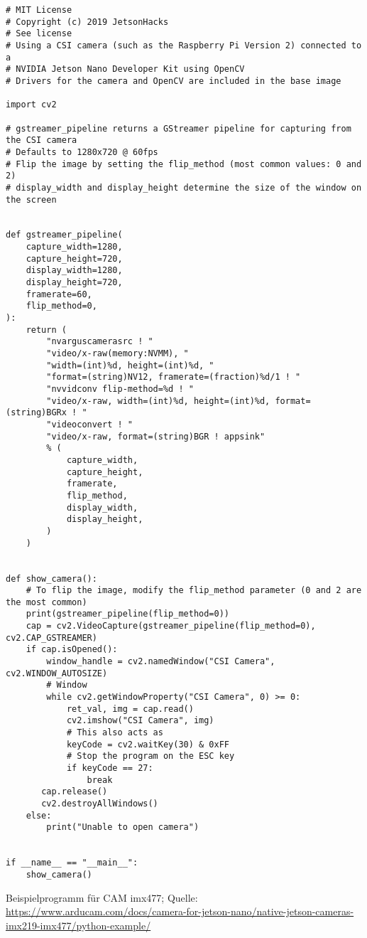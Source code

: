 \begin{code}

\begin{lstlisting}
# MIT License
# Copyright (c) 2019 JetsonHacks
# See license
# Using a CSI camera (such as the Raspberry Pi Version 2) connected to a
# NVIDIA Jetson Nano Developer Kit using OpenCV
# Drivers for the camera and OpenCV are included in the base image

import cv2

# gstreamer_pipeline returns a GStreamer pipeline for capturing from the CSI camera
# Defaults to 1280x720 @ 60fps
# Flip the image by setting the flip_method (most common values: 0 and 2)
# display_width and display_height determine the size of the window on the screen


def gstreamer_pipeline(
    capture_width=1280,
    capture_height=720,
    display_width=1280,
    display_height=720,
    framerate=60,
    flip_method=0,
):
    return (
        "nvarguscamerasrc ! "
        "video/x-raw(memory:NVMM), "
        "width=(int)%d, height=(int)%d, "
        "format=(string)NV12, framerate=(fraction)%d/1 ! "
        "nvvidconv flip-method=%d ! "
        "video/x-raw, width=(int)%d, height=(int)%d, format=(string)BGRx ! "
        "videoconvert ! "
        "video/x-raw, format=(string)BGR ! appsink"
        % (
            capture_width,
            capture_height,
            framerate,
            flip_method,
            display_width,
            display_height,
        )
    )


def show_camera():
    # To flip the image, modify the flip_method parameter (0 and 2 are the most common)
    print(gstreamer_pipeline(flip_method=0))
    cap = cv2.VideoCapture(gstreamer_pipeline(flip_method=0), cv2.CAP_GSTREAMER)
    if cap.isOpened():
        window_handle = cv2.namedWindow("CSI Camera", cv2.WINDOW_AUTOSIZE)
        # Window
        while cv2.getWindowProperty("CSI Camera", 0) >= 0:
            ret_val, img = cap.read()
            cv2.imshow("CSI Camera", img)
            # This also acts as
            keyCode = cv2.waitKey(30) & 0xFF
            # Stop the program on the ESC key
            if keyCode == 27:
                break
       cap.release()
       cv2.destroyAllWindows()
    else:
        print("Unable to open camera")


if __name__ == "__main__":
    show_camera()
\end{lstlisting}

  \caption{Beispielprogramm für CAM imx477; Quelle: \url{https://www.arducam.com/docs/camera-for-jetson-nano/native-jetson-cameras-imx219-imx477/python-example/}}
\end{code}


